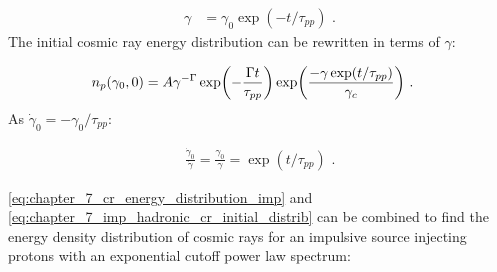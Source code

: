 \begin{equation}
    \begin{aligned}
        \gamma&=\gamma_0\exp(-t/\tau_{pp})\text{ .}
    \end{aligned} \label{eq:chapter_7_hadron_loss_solution}
\end{equation}
\noindent The initial cosmic ray energy distribution can be rewritten in terms of $\gamma$:

\begin{equation}
    \begin{aligned}
    	n_p\qty(\gamma_0,0)&=A\gamma^{-\Gamma} \exp(-\frac{\Gamma t}{\tau_{pp}})\exp(\frac{-\gamma\exp(t/\tau_{pp})}{\gamma_c}) \text{ .}
    \end{aligned} \label{eq:chapter_7_imp_hadronic_cr_initial_distrib}
\end{equation}
\noindent As $\dot{\gamma}_0=-\gamma_0/\tau_{pp}$:

\begin{equation}
	\begin{aligned}
		\frac{\dot{\gamma}_0}{\dot{\gamma}}=\frac{\gamma_0}{\gamma}=\exp(t/\tau_{pp})\text{ .}
	\end{aligned} \label{eq:07_hadron_gammadot_ratio}
\end{equation}

\autoref{eq:chapter_7_cr_energy_distribution_imp} and \autoref{eq:chapter_7_imp_hadronic_cr_initial_distrib} can be combined to find the energy density distribution of cosmic rays for an impulsive source injecting protons with an exponential cutoff power law spectrum:

